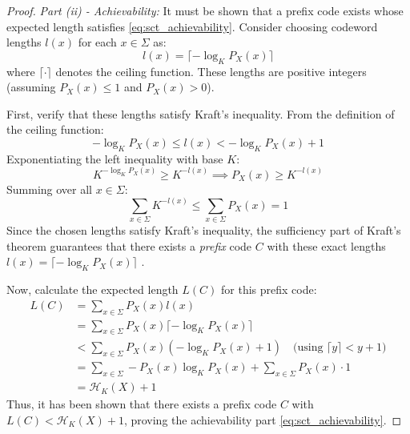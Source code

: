 \begin{proof}
    \emph{Part (ii) - Achievability:}
    It must be shown that a prefix code exists whose expected length satisfies \eqref{eq:sct_achievability}. Consider choosing codeword lengths $l(x)$ for each $x \in \Sigma$ as:
    \begin{equation*}
        l(x) = \lceil -\log_K P_X(x) \rceil
    \end{equation*}
    where $\lceil \cdot \rceil$ denotes the ceiling function. These lengths are positive integers (assuming $P_X(x) \le 1$ and $P_X(x) > 0$).

    First, verify that these lengths satisfy Kraft's inequality. From the definition of the ceiling function:
    \begin{equation*}
        -\log_K P_X(x) \le l(x) < -\log_K P_X(x) + 1
    \end{equation*}
    Exponentiating the left inequality with base $K$:
    \begin{equation*}
        K^{-\log_K P_X(x)} \ge K^{-l(x)} \implies P_X(x) \ge K^{-l(x)}
    \end{equation*}
    Summing over all $x \in \Sigma$:
    \begin{equation*}
        \sum_{x \in \Sigma} K^{-l(x)} \le \sum_{x \in \Sigma} P_X(x) = 1
    \end{equation*}
    Since the chosen lengths satisfy Kraft's inequality, the sufficiency part of Kraft's theorem guarantees that there exists a \emph{prefix} code $C$ with these exact lengths $l(x) = \lceil -\log_K P_X(x) \rceil$ \cite{ElementsofInformationTheory,han2002mathematics}.

    Now, calculate the expected length $L(C)$ for this prefix code:
    \begin{align*}
        L(C) & = \sum_{x \in \Sigma} P_X(x) l(x)                                                                                    \\
             & = \sum_{x \in \Sigma} P_X(x) \lceil -\log_K P_X(x) \rceil                                                            \\
             & < \sum_{x \in \Sigma} P_X(x) \left( -\log_K P_X(x) + 1 \right) \quad \text{(using } \lceil y \rceil < y + 1 \text{)} \\
             & = \sum_{x \in \Sigma} -P_X(x) \log_K P_X(x) + \sum_{x \in \Sigma} P_X(x) \cdot 1                                     \\
             & = \mathcal{H}_K(X) + 1
    \end{align*}
    Thus, it has been shown that there exists a prefix code $C$ with $L(C) < \mathcal{H}_K(X) + 1$, proving the achievability part \eqref{eq:sct_achievability}.
\end{proof}

